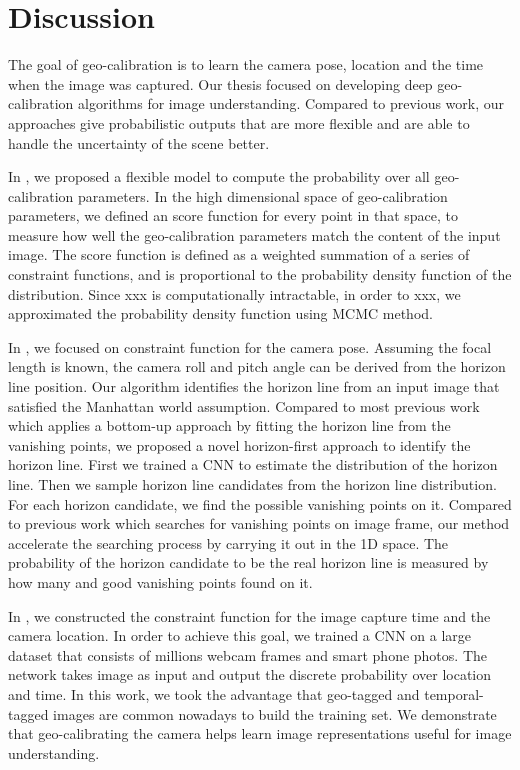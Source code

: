 \chapter{Discussion}
\label{chap:discussion}

The goal of geo-calibration is to learn the camera pose, location and
the time when the image was captured.
Our thesis focused on developing deep geo-calibration algorithms for
image understanding.
Compared to previous work, our approaches give
probabilistic outputs that are more flexible and are able to handle
the uncertainty of the scene better.

In , we proposed a flexible model to compute the
probability over all geo-calibration parameters. In the high
dimensional space of geo-calibration parameters, we defined an score
function for every point in that space, to measure how well the
geo-calibration parameters match the content of the input image. The
score function is defined as a weighted summation of a series of
constraint functions, and is proportional to the probability density
function of the distribution. Since xxx is computationally
intractable, in order to xxx, we approximated the probability
density function using MCMC method.

In , we focused on constraint function for the
camera pose. Assuming the focal length is known, the camera roll and
pitch angle can be derived from the horizon line position. Our
algorithm identifies the horizon line from an input image that
satisfied the Manhattan world assumption.
Compared to most previous work which applies a bottom-up approach by
fitting the horizon line from the vanishing points, we proposed a
novel horizon-first approach to identify the horizon line.
First we trained a CNN to estimate the distribution of the horizon
line. Then we sample horizon line candidates from the horizon line
distribution. For each horizon candidate, we find the possible
vanishing points on it. Compared to previous work which searches for 
vanishing points on image frame, our method accelerate the searching
process by carrying it out in the 1D space. The probability of the
horizon candidate to be the real horizon line is measured by how many
and good vanishing points found on it. 

In , we constructed the constraint function for 
the image capture time and the camera location. In order to achieve
this goal, we trained a CNN on a large dataset that consists of
millions webcam frames and smart phone photos. The network takes image
as input and output the discrete probability over location and time.
In this work, we took the advantage that geo-tagged and
temporal-tagged images are common nowadays to build the training set.
We demonstrate that geo-calibrating the camera helps learn image
representations useful for image understanding.

